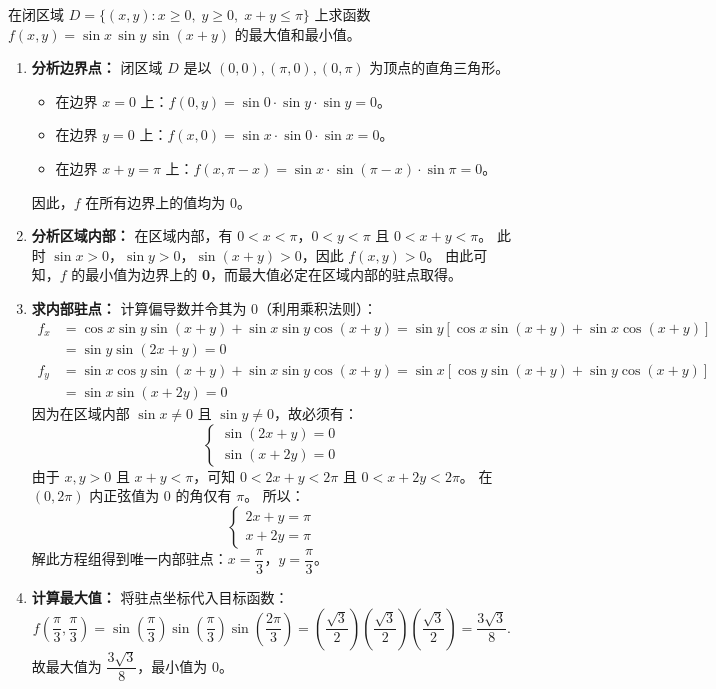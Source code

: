 \documentclass[lang=cn,11pt]{elegantbook}
\begin{document}
\begin{exercise}
在闭区域 $D=\{(x,y):x\geq 0,\;y\geq 0,\;x+y\leq\pi\}$ 上求函数 $f(x,y)=\sin x\,\sin y\,\sin(x+y)$ 的最大值和最小值。
\end{exercise}
\begin{solution}
\begin{enumerate}
  \item \textbf{分析边界点：}
  闭区域 $D$ 是以 $(0,0), (\pi,0), (0,\pi)$ 为顶点的直角三角形。
  \begin{itemize}
    \item 在边界 $x=0$ 上：$f(0,y) = \sin 0 \cdot \sin y \cdot \sin y = 0$。
    \item 在边界 $y=0$ 上：$f(x,0) = \sin x \cdot \sin 0 \cdot \sin x = 0$。
    \item 在边界 $x+y=\pi$ 上：$f(x,\pi-x) = \sin x \cdot \sin(\pi-x) \cdot \sin\pi = 0$。
  \end{itemize}
  因此，$f$ 在所有边界上的值均为 0。
  \item \textbf{分析区域内部：}
  在区域内部，有 $0 < x < \pi$，$0 < y < \pi$ 且 $0 < x+y < \pi$。
  此时 $\sin x > 0$，$\sin y > 0$，$\sin(x+y) > 0$，因此 $f(x,y) > 0$。
  由此可知，$f$ 的最小值为边界上的 \textbf{0}，而最大值必定在区域内部的驻点取得。
  \item \textbf{求内部驻点：}
  计算偏导数并令其为 0（利用乘积法则）：
  \begin{align*}
  f_x &= \cos x \sin y \sin(x+y) + \sin x \sin y \cos(x+y) = \sin y \left[ \cos x \sin(x+y) + \sin x \cos(x+y) \right] \\
      &= \sin y \sin(2x+y) = 0 \\
  f_y &= \sin x \cos y \sin(x+y) + \sin x \sin y \cos(x+y) = \sin x \left[ \cos y \sin(x+y) + \sin y \cos(x+y) \right] \\
      &= \sin x \sin(x+2y) = 0
  \end{align*}
  因为在区域内部 $\sin x \neq 0$ 且 $\sin y \neq 0$，故必须有：
  \[
  \begin{cases}
  \sin(2x+y) = 0 \\
  \sin(x+2y) = 0
  \end{cases}
  \]
  由于 $x,y > 0$ 且 $x+y < \pi$，可知 $0 < 2x+y < 2\pi$ 且 $0 < x+2y < 2\pi$。
  在 $(0,2\pi)$ 内正弦值为 0 的角仅有 $\pi$。
  所以：
  \[
  \begin{cases}
  2x+y = \pi \\
  x+2y = \pi
  \end{cases}
  \]
  解此方程组得到唯一内部驻点：$x = \dfrac{\pi}{3}$，$y = \dfrac{\pi}{3}$。
  \item \textbf{计算最大值：}
  将驻点坐标代入目标函数：
  \[
  f\left(\frac{\pi}{3},\frac{\pi}{3}\right) = \sin\left(\frac{\pi}{3}\right) \sin\left(\frac{\pi}{3}\right) \sin\left(\frac{2\pi}{3}\right) = \left(\frac{\sqrt{3}}{2}\right) \left(\frac{\sqrt{3}}{2}\right) \left(\frac{\sqrt{3}}{2}\right) = \frac{3\sqrt{3}}{8}.
  \]
  故最大值为 $\boxed{\dfrac{3\sqrt{3}}{8}}$，最小值为 $\boxed{0}$。
\end{enumerate}
\end{solution}
\end{document}
